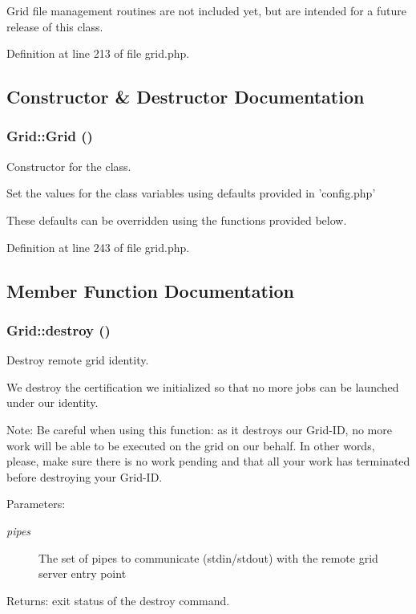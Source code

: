 Grid file management routines are not included yet, but are intended for a future release of this class. 



Definition at line 213 of file grid.php.

\subsection{Constructor \& Destructor Documentation}
\subsubsection{\setlength{\rightskip}{0pt plus 5cm}Grid::Grid ()}\label{classGrid_a0}


Constructor for the class. 

Set the values for the class variables using defaults provided in 'config.php'

These defaults can be overridden using the functions provided below. 

Definition at line 243 of file grid.php.

\subsection{Member Function Documentation}
\subsubsection{\setlength{\rightskip}{0pt plus 5cm}Grid::destroy ()}\label{classGrid_a19}


Destroy remote grid identity. 

We destroy the certification we initialized so that no more jobs can be launched under our identity.

\begin{Desc}
\item[Note:]Be careful when using this function: as it destroys our Grid-ID, no more work will be able to be executed on the grid on our behalf. In other words, please, make sure there is no work pending and that all your work has terminated before destroying your Grid-ID.\end{Desc}
\begin{Desc}
\item[Parameters:]
\begin{description}
\item[{\em pipes}]The set of pipes to communicate (stdin/stdout) with the remote grid server entry point\end{description}
\end{Desc}
\begin{Desc}
\item[Returns:]exit status of the destroy command. \end{Desc}


